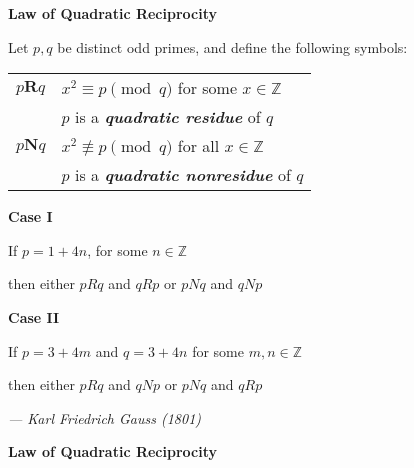 \documentclass[17pt]{memoir}
\begin{document}
\begin{center}
  \textbf{Law of Quadratic Reciprocity}
\end{center}

Let $p, q$ be distinct odd primes, and define the following symbols:

\medskip
\begin{table}[h]
\centering
  \begin{tabular}{l|l}
  $p\boldsymbol{R}q$ & $x^2 \equiv p\pmod q$ for some $x \in \mathbb{Z}$ \\
   &  $p$ is a \textbf{\textit{quadratic residue}} of $q$ \\
   \hline
  $p\boldsymbol{N}q$ & $x^2 \not\equiv p\pmod q$ for all $x \in \mathbb{Z}$ \\
   &  $p$ is a \textbf{\textit{quadratic nonresidue}} of $q$ \\
  \end{tabular}
\end{table}

\medskip
\textbf{Case I}

If $p = 1 + 4n$, for some $n \in \mathbb{Z}$

then either $pRq$ and $qRp$ or $pNq$ and $qNp$

\medskip
\textbf{Case II}

If $p = 3 + 4m$ and $q = 3 + 4n$ for some $m,n \in \mathbb{Z}$

then either $pRq$ and $qNp$ or $pNq$ and $qRp$

\bigskip
\begin{flushright}
  \textit{--- Karl Friedrich Gauss (1801)}
\end{flushright}

\newpage

\begin{center}
  \textbf{Law of Quadratic Reciprocity}
\end{center}
\end{document}
